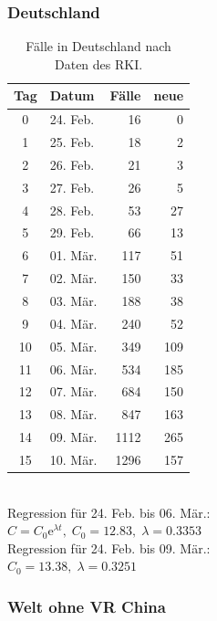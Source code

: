 \documentclass[a4paper,11pt,fleqn,twocolumn,twoside,dvipdfmx]{scrartcl}
\numberwithin{equation}{section}
\newcommand{\ee}{\mathrm e}
\newcommand{\strong}[1]{\textbf{#1}}
\begin{document}
\subsubsection*{Deutschland}
\vspace{-6mm}
\begin{table}[h]
\caption{Fälle in Deutschland\newline
nach Daten des RKI.}
\begin{tabular}{clrr}
\toprule
\strong{Tag} & \strong{Datum} & \strong{Fälle} & \strong{neue}\\
\midrule
0 & 24. Feb. & 16 & 0\\
1 & 25. Feb. & 18 & 2\\
2 & 26. Feb. & 21 & 3\\
3 & 27. Feb. & 26 & 5\\
4 & 28. Feb. & 53 & 27\\
5 & 29. Feb. & 66 & 13\\
6 & 01. Mär. & 117 & 51\\
7 & 02. Mär. & 150 & 33\\
8 & 03. Mär. & 188 & 38\\
9 & 04. Mär. & 240 & 52\\
10 & 05. Mär. & 349 & 109\\
11 & 06. Mär. & 534 & 185\\
12 & 07. Mär. & 684 & 150\\
13 & 08. Mär. & 847 & 163\\
14 & 09. Mär. & 1112 & 265\\
15 & 10. Mär. & 1296 & 157\\
\bottomrule
\end{tabular}\\[6pt]
Regression für 24. Feb. bis 06. Mär.:\\
$C = C_0\ee^{\lambda t},\; C_0=12.83,\; \lambda=0.3353$\\[4pt]
Regression für 24. Feb. bis 09. Mär.:\\
$C_0=13.38,\;\lambda=0.3251$
\vspace{-4em}
\end{table}

\newpage
\subsubsection*{Welt ohne VR China}
\end{document}
